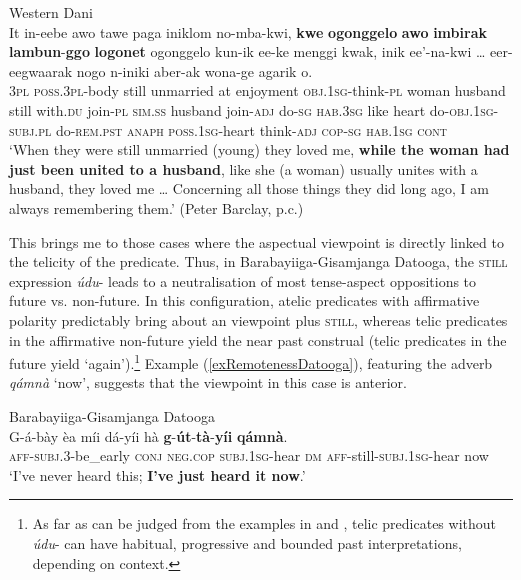 \begin{exe}
\ex Western Dani \label{exRemotenessWesternDaniMedial}\\
\gll It in-eebe awo tawe paga iniklom no-mba-kwi, \textbf{kwe} \textbf{ogonggelo} \textbf{awo} \textbf{imbirak} \textbf{lambun}-\textbf{ggo} \textbf{logonet} ogonggelo kun-ik ee-ke menggi kwak, inik ee'-na-kwi … eer-eegwaarak nogo n-iniki aber-ak wona-ge agarik o.\\
3\textsc{pl} \textsc{poss}.3\textsc{pl}-body still unmarried at enjoyment \textsc{obj}.1\textsc{sg}-think-\textsc{pl} woman husband still with.\textsc{du} join-\textsc{pl} \textsc{sim}.\textsc{ss} husband join-\textsc{adj} do-\textsc{sg} \textsc{hab}.3\textsc{sg} like heart do-\textsc{obj}.1\textsc{sg}-\textsc{subj}.\textsc{pl} {} do-\textsc{rem}.\textsc{pst} \textsc{anaph} \textsc{poss}.1\textsc{sg}-heart think-\textsc{adj} \textsc{cop}-\textsc{sg} \textsc{hab}.1\textsc{sg} \textsc{cont}\\
\glt \lq When they were still unmarried (young) they loved me, \textbf{while the woman had just been united to a husband}, like she (a woman) usually unites with a husband, they loved me … Concerning all those things they did long ago, I am always remembering them.' (Peter Barclay, p.c.)
\end{exe}

This brings me to those cases where the aspectual viewpoint is directly linked to the telicity of the predicate. Thus, in Barabayiiga-Gisamjanga Datooga, the \textsc{still} expression \mbox{\textit{údu}-} leads to a neutralisation of most tense-aspect oppositions to future vs. non-future. In this configuration, atelic predicates with affirmative polarity predictably bring about an  viewpoint plus \textsc{still}, whereas telic predicates in the affirmative non-future yield the near past construal (telic predicates in the future yield \lq again').\footnote{As far as can be judged from the examples in \textcite{Kiessling2000} and \textcite[177–179]{Rottland1982}, telic predicates without \mbox{\textit{údu}-} can have habitual, progressive and bounded past interpretations, depending on context.} Example (\ref{exRemotenessDatooga}), featuring the adverb \textit{qámnà} \lq now', suggests that the viewpoint in this case is anterior.

\begin{exe}
\ex Barabayiiga-Gisamjanga Datooga\label{exRemotenessDatooga}\\
\gll G-á-bày èa míi dá-yíi hà \textbf{g}-\textbf{út}-\textbf{tà}-\textbf{yíi} \textbf{qámnà}.\\
\textsc{aff}-\textsc{subj}.3-be\_early \textsc{conj} \textsc{neg}.\textsc{cop} \textsc{subj}.1\textsc{sg}-hear \textsc{dm} \textsc{aff}-still-\textsc{subj}.1\textsc{sg}-hear now\\
\glt \lq I've never heard this; \textbf{I've just heard it now}.' \parencite[431]{Mitchell2021}
\end{exe}

